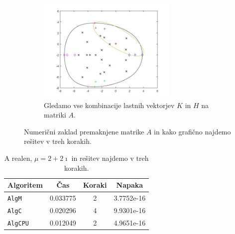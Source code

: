 \documentclass[12pt,a4paper]{amsart}
\theoremstyle{definition}
\theoremstyle{plain}
\begin{document}
\begin{figure}[H]
\begin{subfigure}[t]{0.45\textwidth}
\label{fig:p53}
\end{subfigure}%
\hfill
\begin{subfigure}[t]{0.45\textwidth}
\includegraphics[width=0.9\linewidth,height=5cm]{RC3e3.jpg}
\caption{Gledamo vse kombinacije lastnih vektorjev $K$ in $H$ na matriki $A$.\footnotemark[\value{footnote}]}
\label{fig:p53}
\end{subfigure}
\caption{Numerični zaklad premaknjene matrike $A$ in kako grafično najdemo rešitev v treh korakih.}
\end{figure}

\begin{table}[H]
\caption{A realen, $\mu = 2 + 2\imath$ in rešitev najdemo v treh korakih.}
\begin{tabular}{|l|c|c|c|}
\hline
Algoritem & Čas & Koraki & Napaka\\
\hline
\hline
\verb+AlgM+ &0.033775&2&3.7752e-16\\
\hline
\verb+AlgC+ &0.020296 &4 & 9.9301e-16\\
\hline
\verb+AlgCPU+ &0.012049&2&4.9651e-16 \\
\hline
\end{tabular}

\label{t5}
\end{table}
\end{document}
